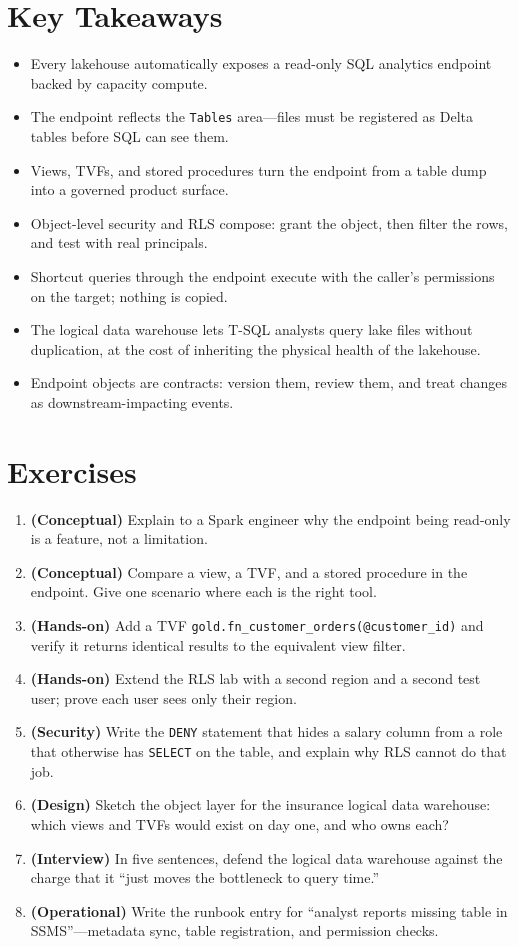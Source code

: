 \section*{Key Takeaways}
\begin{itemize}
    \item Every lakehouse automatically exposes a read-only SQL analytics endpoint backed by capacity compute.
    \item The endpoint reflects the \texttt{Tables} area---files must be registered as Delta tables before SQL can see them.
    \item Views, TVFs, and stored procedures turn the endpoint from a table dump into a governed product surface.
    \item Object-level security and RLS compose: grant the object, then filter the rows, and test with real principals.
    \item Shortcut queries through the endpoint execute with the caller's permissions on the target; nothing is copied.
    \item The logical data warehouse lets T-SQL analysts query lake files without duplication, at the cost of inheriting the physical health of the lakehouse.
    \item Endpoint objects are contracts: version them, review them, and treat changes as downstream-impacting events.
\end{itemize}

\section{Exercises}
\begin{enumerate}
    \item \textbf{(Conceptual)} Explain to a Spark engineer why the endpoint being read-only is a feature, not a limitation.
    \item \textbf{(Conceptual)} Compare a view, a TVF, and a stored procedure in the endpoint. Give one scenario where each is the right tool.
    \item \textbf{(Hands-on)} Add a TVF \texttt{gold.fn\_customer\_orders(@customer\_id)} and verify it returns identical results to the equivalent view filter.
    \item \textbf{(Hands-on)} Extend the RLS lab with a second region and a second test user; prove each user sees only their region.
    \item \textbf{(Security)} Write the \texttt{DENY} statement that hides a salary column from a role that otherwise has \texttt{SELECT} on the table, and explain why RLS cannot do that job.
    \item \textbf{(Design)} Sketch the object layer for the insurance logical data warehouse: which views and TVFs would exist on day one, and who owns each?
    \item \textbf{(Interview)} In five sentences, defend the logical data warehouse against the charge that it ``just moves the bottleneck to query time.''
    \item \textbf{(Operational)} Write the runbook entry for ``analyst reports missing table in SSMS''---metadata sync, table registration, and permission checks.
\end{enumerate}


